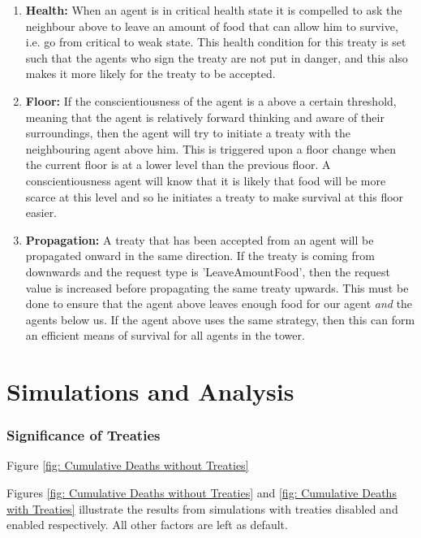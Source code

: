 \begin{enumerate}
    \item \textbf{Health:} When an agent is in critical health state it is compelled to ask the neighbour above to leave an amount of food that can allow him to survive, i.e. go from critical to weak state. This health condition for this treaty is set such that the agents who sign the treaty are not put in danger, and this also makes it more likely for the treaty to be accepted.
    
    \item \textbf{Floor:} If the conscientiousness of the agent is a above a certain threshold, meaning that the agent is relatively forward thinking and aware of their surroundings, then the agent will try to initiate a treaty with the neighbouring agent above him. This is triggered upon a floor change when the current floor is at a lower level than the previous floor. A conscientiousness agent will know that it is likely that food will be more scarce at this level and so he initiates a treaty to make survival at this floor easier.
    
    \item \textbf{Propagation:} A treaty that has been accepted from an agent will be propagated onward in the same direction. If the treaty is coming from downwards and the request type is 'LeaveAmountFood', then the request value is increased before propagating the same treaty upwards. This must be done to ensure that the agent above leaves enough food for our agent \textit{and} the agents below us. If the agent above uses the same strategy, then this can form an efficient means of survival for all agents in the tower.
\end{enumerate}

\newpage
\section{Simulations and Analysis}
\subsubsection{Significance of Treaties}
\label{sec: Simulations and Analysis}

Figure \ref{fig: Cumulative Deaths without Treaties} 

Figures \ref{fig: Cumulative Deaths without Treaties} and \ref{fig: Cumulative Deaths with Treaties} illustrate the results from simulations with treaties disabled and enabled respectively. All other factors are left as default.

